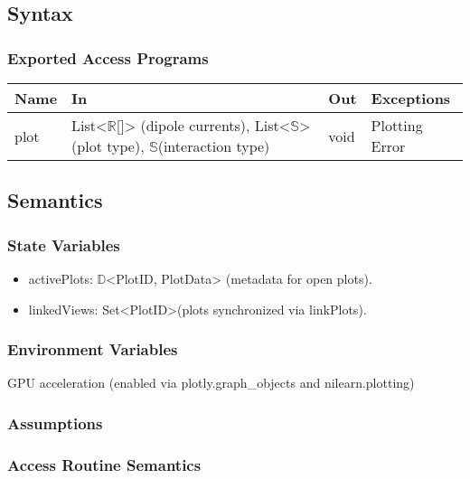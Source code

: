\documentclass[12pt, titlepage]{article}
\begin{document}
\subsection{Syntax}


\subsubsection{Exported Access Programs}

\begin{center}
\begin{tabular}{p{2cm} p{4cm} p{4cm} p{2cm}}
\hline
\textbf{Name} & \textbf{In} & \textbf{Out} & \textbf{Exceptions} \\
\hline
plot & List<$\mathbb{R}$[]> (dipole currents), List<$\mathbb{S}$>(plot type), $\mathbb{S}$(interaction type) & void & Plotting Error \\

\hline
\end{tabular}
\end{center}

\subsection{Semantics}

\subsubsection{State Variables}

\begin{itemize}
\item activePlots: $\mathbb{D}$<PlotID, PlotData> (metadata for open plots).


\item linkedViews: Set<PlotID>(plots synchronized via linkPlots).


\end{itemize}


\subsubsection{Environment Variables}

GPU acceleration (enabled via plotly.graph\_objects and nilearn.plotting)
\subsubsection{Assumptions}


\subsubsection{Access Routine Semantics}
\end{document}
